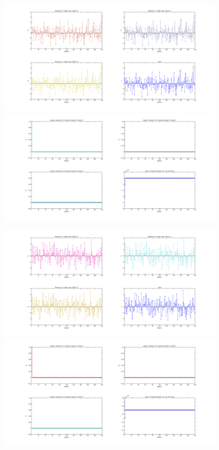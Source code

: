 \documentclass[a4paper,oneside,12pt]{article}
\begin{document}
\begin{figure}[H]
\centering
\includegraphics[scale=0.35]{s_2.png} \\
\includegraphics[scale=0.35]{q_2.png} \\
\label{}
\end{figure}

\begin{figure}[H]
\centering
\includegraphics[scale=0.35]{s_3.png} \\
\includegraphics[scale=0.35]{q_3.png} \\
\label{}
\end{figure}
\end{document}
